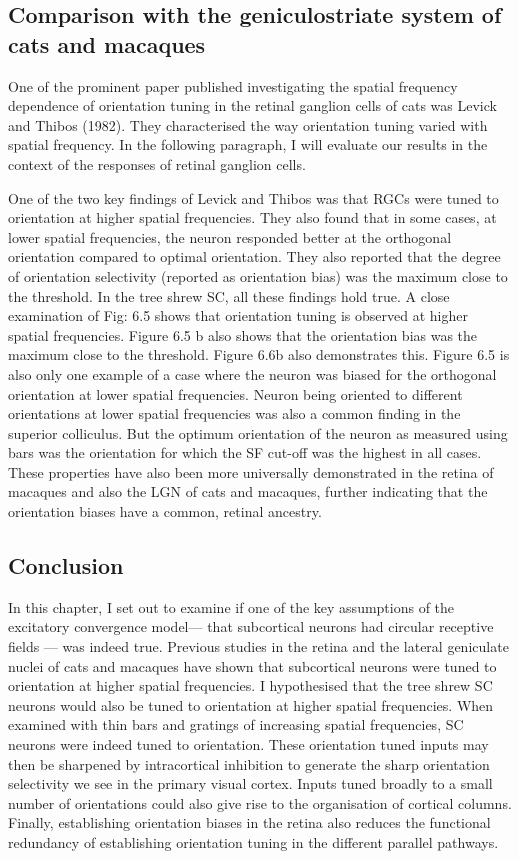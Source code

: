		\subsection {Comparison with the geniculostriate system of cats and macaques}
		One of the prominent paper published investigating the spatial frequency dependence of orientation tuning in the retinal ganglion cells of cats was Levick and Thibos (1982). They characterised the way orientation tuning varied with spatial frequency. In the following paragraph, I will evaluate our results in the context of the responses of retinal ganglion cells.
		
		One of the two key findings of Levick and Thibos was that RGCs were tuned to orientation at higher spatial frequencies. They also found that in some cases, at lower spatial frequencies, the neuron responded better at the orthogonal orientation compared to optimal orientation. They also reported that the degree of orientation selectivity (reported as orientation bias) was the maximum close to the threshold. In the tree shrew SC, all these findings hold true. A close examination of Fig: 6.5 shows that orientation tuning is observed at higher spatial frequencies. Figure 6.5 b also shows that the orientation bias was the maximum close to the threshold. Figure 6.6b also demonstrates this. Figure 6.5 is also only one example of a case where the neuron was biased for the orthogonal orientation at lower spatial frequencies. Neuron being oriented to different orientations at lower spatial frequencies was also a common finding in the superior colliculus. But the optimum orientation of the neuron as measured using bars was the orientation for which the SF cut-off was the highest in all cases. These properties have also been more universally demonstrated in the retina of macaques and also the LGN of cats and macaques, further indicating that the orientation biases have a common, retinal ancestry.
		
		\subsection{Conclusion}
		
		In this chapter, I set out to examine if one of the key assumptions of the excitatory convergence model— that subcortical neurons had circular receptive fields — was indeed true. Previous studies in the retina and the lateral geniculate nuclei of cats and macaques have shown that subcortical neurons were tuned to orientation at higher spatial frequencies. I hypothesised that the tree shrew SC neurons would also be tuned to orientation at higher spatial frequencies. When examined with thin bars and gratings of increasing spatial frequencies, SC neurons were indeed tuned to orientation. These orientation tuned inputs may then be sharpened by intracortical inhibition to generate the sharp orientation selectivity we see in the primary visual cortex. Inputs tuned broadly to a small number of orientations could also give rise to the organisation of cortical columns. Finally, establishing orientation biases in the retina also reduces the functional redundancy of establishing orientation tuning in the different parallel pathways.
		
		

	